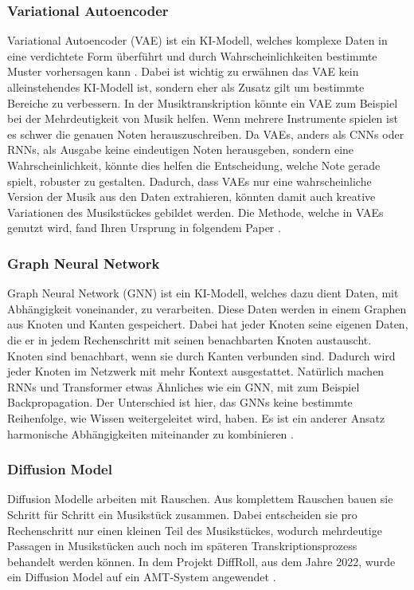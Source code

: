 \subsubsection*{Variational Autoencoder}
Variational Autoencoder (VAE) ist ein KI-Modell, welches komplexe Daten in eine verdichtete Form überführt
und durch Wahrscheinlichkeiten bestimmte Muster vorhersagen kann \cite{kingma2019introduction}.
Dabei ist wichtig zu erwähnen das VAE kein alleinstehendes KI-Modell ist,
sondern eher als Zusatz gilt um bestimmte Bereiche zu verbessern.
In der Musiktranskription könnte ein VAE zum Beispiel bei der Mehrdeutigkeit von Musik helfen.
Wenn mehrere Instrumente spielen ist es schwer die genauen Noten herauszuschreiben.
Da VAEs, anders als CNNs oder RNNs, als Ausgabe keine eindeutigen Noten herausgeben,
sondern eine Wahrscheinlichkeit, könnte dies helfen die Entscheidung, welche Note gerade spielt, robuster zu gestalten.
Dadurch, dass VAEs nur eine wahrscheinliche Version der Musik aus den Daten extrahieren,
könnten damit auch kreative Variationen des Musikstückes gebildet werden.
Die Methode, welche in VAEs genutzt wird, fand Ihren Ursprung in folgendem Paper \cite{kingma2013auto}.

\subsubsection*{Graph Neural Network}
Graph Neural Network (GNN) ist ein KI-Modell, welches dazu dient Daten, mit Abhängigkeit voneinander, zu verarbeiten.
Diese Daten werden in einem Graphen aus Knoten und Kanten gespeichert.
Dabei hat jeder Knoten seine eigenen Daten, die er in jedem Rechenschritt mit seinen benachbarten Knoten austauscht.
Knoten sind benachbart, wenn sie durch Kanten verbunden sind.
Dadurch wird jeder Knoten im Netzwerk mit mehr Kontext ausgestattet.
Natürlich machen RNNs und Transformer etwas Ähnliches wie ein GNN, mit zum Beispiel Backpropagation.
Der Unterschied ist hier, das GNNs keine bestimmte Reihenfolge, wie Wissen weitergeleitet wird, haben.
Es ist ein anderer Ansatz harmonische Abhängigkeiten miteinander zu kombinieren \cite{wu2020comprehensive}.

\subsubsection*{Diffusion Model}
Diffusion Modelle arbeiten mit Rauschen.
Aus komplettem Rauschen bauen sie Schritt für Schritt ein Musikstück zusammen.
Dabei entscheiden sie pro Rechenschritt nur einen kleinen Teil des Musikstückes,
wodurch mehrdeutige Passagen in Musikstücken auch noch im späteren Transkriptionsprozess behandelt werden können.
In dem Projekt DiffRoll, aus dem Jahre 2022, wurde ein Diffusion Model auf ein AMT-System angewendet \cite{cheuk2022diffroll}.

